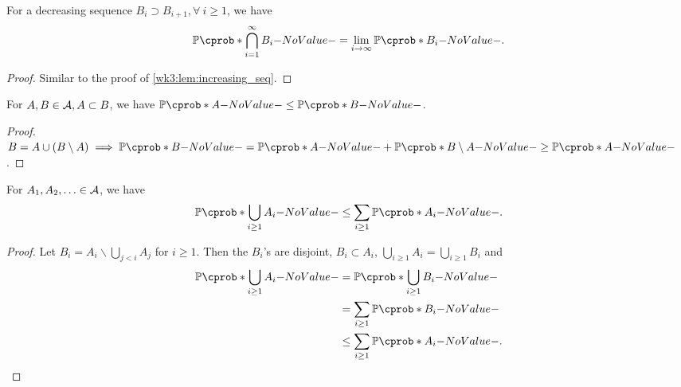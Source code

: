 \documentclass[12pt]{article}
\begin{document}
\begin{Corollary}\label{wk3:cor:dec_seq}
For a decreasing sequence $B_i \supset B_{i+1}, \forall\ i\geq1$, we have
\begin{align*}
\P(\bigcap\limits_{i=1}^{\infty} B_i) = \lim_{i \to \infty} \P(B_i).
\end{align*}
\end{Corollary}
%
\begin{proof}
Similar to the proof of \cref{wk3:lem:increasing_seq}.
\end{proof}

\begin{Lemma}
For $A, B \in \mathcal{A}, A \subset B$, we have $\P(A) \leq \P(B)$.
\end{Lemma}
\begin{proof}
$B = A \cup (B \setminus A) \implies \P(B) = \P(A) + \P(B \setminus A) \geq \P(A)$.
\end{proof}

\begin{Lemma}\label{wk3:lem:union_bound}
For $A_1, A_2, \ldots \in \mathcal{A}$, we have 
\begin{align*}
\P(\bigcup_{i\geq1} A_i) \leq \sum_{i\geq1} \P(A_i).
\end{align*}
\end{Lemma}
\begin{proof}
Let $B_i = A_i \backslash \bigcup_{j<i} A_j$ for $i\geq 1$. Then the $B_i$'s are disjoint, $B_i \subset A_i$, $\bigcup_{i\geq1} A_i =  \bigcup_{i\geq1} B_i$ and
\begin{align*}
\P(\bigcup_{i\geq1} A_i) 
&= \P(\bigcup_{i\geq1} B_i)\\ 
&= \sum_{i\geq1} \P(B_i)\\
&\leq \sum_{i\geq1} \P(A_i).
\end{align*}
\end{proof}
\end{document}
